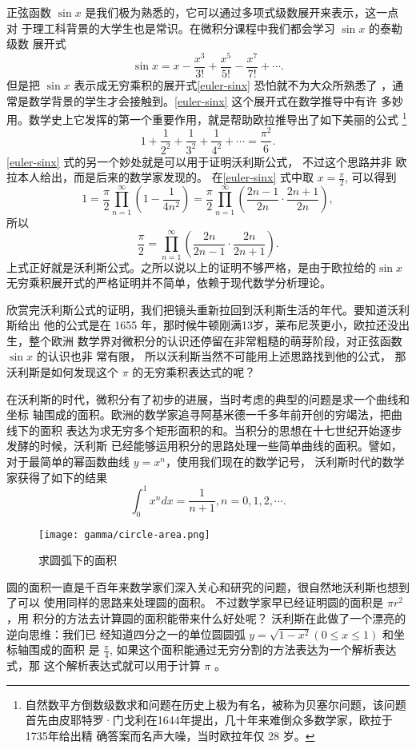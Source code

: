 {正弦函数 $\sin x$ 是我们极为熟悉的，它可以通过多项式级数展开来表示，这一点对
于理工科背景的大学生也是常识。在微积分课程中我们都会学习 $\sin x$ 的泰勒级数
展开式
$$ \sin x = x - \frac{x^3}{3!} + \frac{x^5}{5!} - \frac{x^7}{7!} + \cdots  .$$
但是把 $\sin x$ 表示成无穷乘积的展开式\eqref{euler-sinx} 恐怕就不为大众所熟悉了
，通常是数学背景的学生才会接触到。\eqref{euler-sinx} 这个展开式在数学推导中有许
多妙用。数学史上它发挥的第一个重要作用，就是帮助欧拉推导出了如下美丽的公式
\footnote{自然数平方倒数级数求和问题在历史上极为有名，被称为贝塞尔问题，该问题
首先由皮耶特罗·门戈利在1644年提出，几十年来难倒众多数学家，欧拉于1735年给出精
确答案而名声大噪，当时欧拉年仅 28 岁。}
$$ 1 + \frac{1}{2^2} + \frac{1}{3^2} + \frac{1}{4^2} +  \cdots  = \frac{\pi^2}{6} . $$ 
\eqref{euler-sinx} 式的另一个妙处就是可以用于证明沃利斯公式， 不过这个思路并非
欧拉本人给出，而是后来的数学家发现的。 在\eqref{euler-sinx} 式中取
$x=\frac{\pi}{2}$, 可以得到
$$ 1 = \frac{\pi}{2} \prod_{n=1}^\infty\left(1 - \frac{1}{4n^2}\right)
= \frac{\pi}{2} \prod_{n=1}^\infty\left(\frac{2n-1}{2n} \cdot \frac{2n+1}{2n}\right), 
$$
所以
$$ \frac{\pi}{2} = \prod_{n=1}^\infty\left(\frac{2n}{2n-1} \cdot \frac{2n}{2n+1}\right) .
$$
上式正好就是沃利斯公式。之所以说以上的证明不够严格，是由于欧拉给的$\sin x$
无穷乘积展开式的严格证明并不简单，依赖于现代数学分析理论。 

欣赏完沃利斯公式的证明，我们把镜头重新拉回到沃利斯生活的年代。要知道沃利斯给出
他的公式是在 1655 年，那时候牛顿刚满13岁，莱布尼茨更小，欧拉还没出生，整个欧洲
数学界对微积分的认识还停留在非常粗糙的萌芽阶段，对正弦函数 $\sin x$ 的认识也非
常有限， 所以沃利斯当然不可能用上述思路找到他的公式， 那沃利斯是如何发现这个
$\pi$ 的无穷乘积表达式的呢？

在沃利斯的时代，微积分有了初步的进展，当时考虑的典型的问题是求一个曲线和坐标
轴围成的面积。欧洲的数学家追寻阿基米德一千多年前开创的穷竭法，把曲线下的面积
表达为求无穷多个矩形面积的和。当积分的思想在十七世纪开始逐步发酵的时候，沃利斯
已经能够运用积分的思路处理一些简单曲线的面积。譬如，对于最简单的幂函数曲线
$y=x^n$，使用我们现在的数学记号， 沃利斯时代的数学家获得了如下的结果
$$ \int_0^1 x^n dx = \frac{1}{n+1},  n=0,1,2,\cdots .$$

\begin{figure}[htbp]
\centering
\texttt{[image: gamma/circle-area.png]}
\caption{求圆弧下的面积}
\end{figure}

圆的面积一直是千百年来数学家们深入关心和研究的问题，很自然地沃利斯也想到了可以
使用同样的思路来处理圆的面积。 不过数学家早已经证明圆的面积是 $\pi r^2$，用
积分的方法去计算圆的面积能带来什么好处呢？ 沃利斯在此做了一个漂亮的逆向思维：我们已
经知道四分之一的单位圆圆弧 $y=\sqrt{1-x^2} (0 \le x \le 1)$ 和坐标轴围成的面积
是 $\frac{\pi}{4}$, 如果这个面积能通过无穷分割的方法表达为一个解析表达式，那
这个解析表达式就可以用于计算 $\pi$ 。

}
